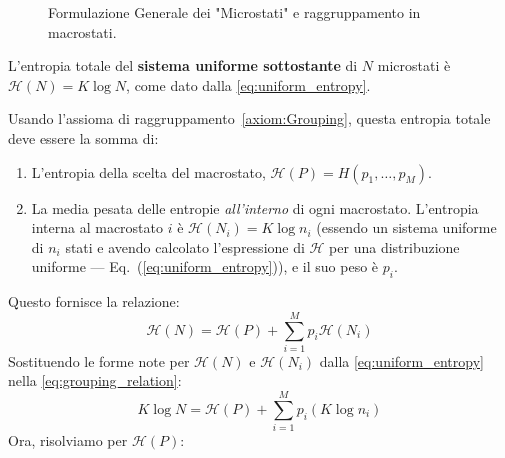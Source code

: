 \begin{enumerate}
\begin{figure}[h!]
    \caption{Formulazione Generale dei "Microstati" e raggruppamento in macrostati.}
    \label{fig:GeneralForm}
\end{figure}

\noindent L'entropia totale del \textbf{sistema uniforme sottostante} di $N$ microstati è $\mathcal{H}(N) = K \log N$, come dato dalla \eqref{eq:uniform_entropy}.

\noindent Usando l'assioma di raggruppamento~\ref{axiom:Grouping}, questa entropia totale deve essere la somma di:
\begin{enumerate}
    \item L'entropia della scelta del macrostato, $\mathcal{H}(P) = H(p_1, \dots, p_M)$.
    \item La media pesata delle entropie \textit{all'interno} di ogni macrostato. L'entropia interna al macrostato $i$ è $\mathcal{H}(N_i) = K \log n_i$ (essendo un sistema uniforme di $n_i$ stati e avendo calcolato l'espressione di $\mathcal{H}$ per una distribuzione uniforme --- Eq.~(\ref{eq:uniform_entropy})), e il suo peso è $p_i$.
\end{enumerate}
Questo fornisce la relazione:
\begin{equation}
    \mathcal{H}(N) = \mathcal{H}(P) + \sum_{i=1}^M p_i \mathcal{H}(N_i)
    \label{eq:grouping_relation}
\end{equation}
Sostituendo le forme note per $\mathcal{H}(N)$ e $\mathcal{H}(N_i)$ dalla \eqref{eq:uniform_entropy} nella \eqref{eq:grouping_relation}:
\begin{equation}
    K \log N = \mathcal{H}(P) + \sum_{i=1}^M p_i (K \log n_i)
\end{equation}
Ora, risolviamo per $\mathcal{H}(P)$:


\end{enumerate}
